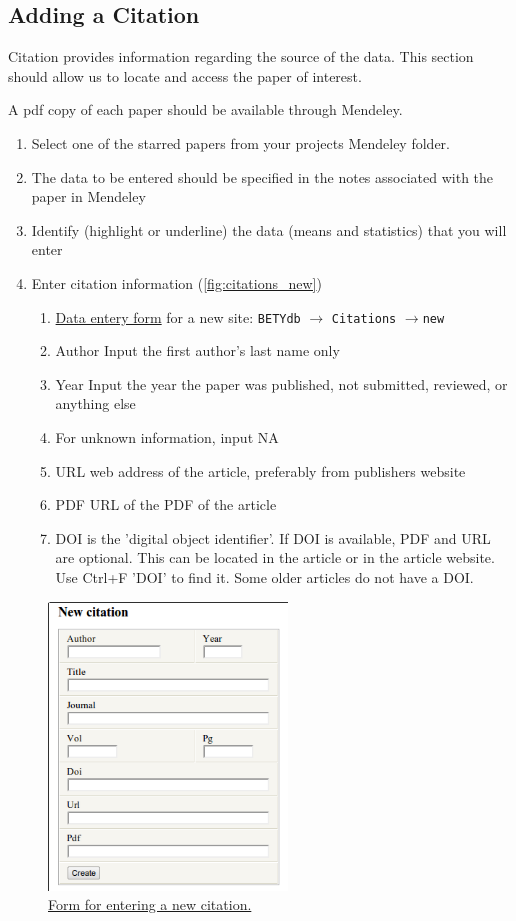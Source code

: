 \documentclass[12pt,english,portrait]{article}
\begin{document}
\subsection{Adding a Citation} 
Citation provides information regarding the source of the data. 
This section should allow us to locate and access the paper of interest.

A pdf copy of each paper should be available through Mendeley. 

\begin{enumerate}
\item Select one of the starred papers from your projects Mendeley folder.
\item The data to be entered should be specified in the notes associated with the paper in Mendeley
\item Identify (highlight or underline) the data (means and statistics) that you will enter
\item Enter citation information (\autoref{fig:citations_new})
  \begin{enumerate}
  \item \href{http://ebi-forecast.igb.uiuc.edu/bety/sites/new}{Data entery form} for a new site:  \verb+BETYdb+ $\rightarrow$ \verb+Citations+ $\rightarrow$\verb+new+  
  \item{Author} Input the first author's last name only 
  \item{Year} Input the year the paper was published, not submitted, reviewed,
    or anything else 
  \item For unknown information, input NA 
  \item{URL} web address of the article, preferably from publishers website
  \item{PDF} URL of the PDF of the article 
  \item{DOI} is the 'digital object identifier'. If DOI is available, PDF and URL are optional. This can be located in the article or in the article website. Use Ctrl+F 'DOI' to find it.  Some older articles do not have a DOI.
  \end{enumerate}
\end{enumerate}

\begin{figure}
  \includegraphics[width=2.5in]{figures/citations_new.png} 
  \caption{\href{http://ebi-forecast.igb.uiuc.edu/bety/citations/new}{Form for entering a new citation.}}
  \label{fig:citations_new}
\end{figure}
\end{document}
